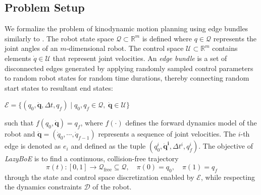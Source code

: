 \subsection{Problem Setup}

We formalize the problem of kinodynamic motion planning using edge bundles similarly to \cite{shome2021asymptotically}.
The robot state space $\mathcal{Q} \subset \mathbb{R}^m$ is defined where $q \in \mathcal{Q}$ represents the joint angles of an $m$-dimensional robot. The control space $\mathcal{U} \subset \mathbb{R}^m$ contains elements $\dot{q} \in \mathcal{U}$ that represent joint velocities.
An \textsl{edge bundle} is a set of disconnected edges generated by applying randomly sampled control parameters to random robot states for random time durations, thereby connecting random start states to resultant end states:
\begin{center}
$\mathcal{E} = \{(q_0, \boldsymbol{\dot{q}}, \Delta t, q_f) \mid q_0, q_f \in \mathcal{Q}, \hspace{3pt} \boldsymbol{\dot{q}} \in \mathcal{U}\}$
\end{center}
such that $f(q_0, \boldsymbol{\dot{q}}) = q_f$, where $f(\cdot)$ defines the forward dynamics model of the robot and $\boldsymbol{\dot{q}} = (\dot{q}_0, \cdots, \dot{q}_{f-1})$ represents a sequence of joint velocities. The $i$-th edge is denoted as $e_i$ and defined as the tuple $(q_0^i, \boldsymbol{\dot{q}^i}, \Delta t^i, q_f^i)$.
The objective of \textsl{LazyBoE} is to find a continuous, collision-free trajectory
$$\pi(t) : [0,1] \rightarrow \mathcal{Q}_{\text{free}} \subseteq \mathcal{Q}, \quad \pi(0) = q_0, \quad \pi(1) = q_f$$
through the state and control space discretization enabled by $\mathcal{E}$, while respecting the dynamics constraints $\mathcal{D}$ of the robot.
